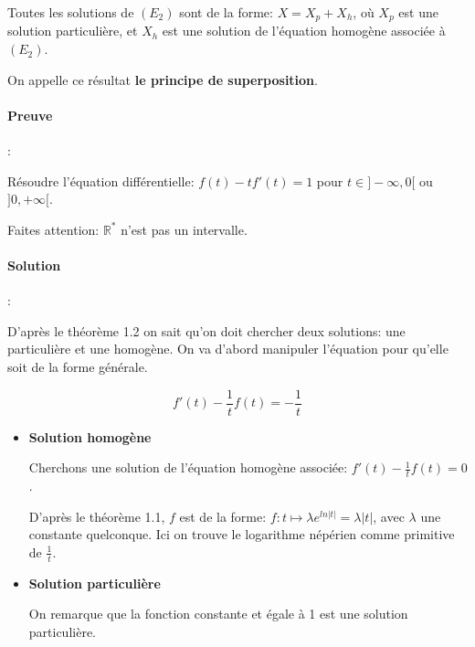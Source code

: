 \documentclass{article}
\begin{document}
\begin{tcolorbox}[colback=red!5!white,colframe=red!75!black,title=Théorème 1.2]

Toutes les solutions de $(E_{2})$ sont de la forme: $X = X_{p} + X_{h}$, où $X_{p}$ est une solution particulière, et $X_{h}$ est une solution de l'équation homogène associée à $(E_{2})$.

\tcblower

On appelle ce résultat \textbf{le principe de superposition}.

\end{tcolorbox}

\paragraph{Preuve}: \space





\begin{tcolorbox}[colback=cyan!5!white,colframe=cyan!75!black,title=Exemple 1.5]

Résoudre l'équation différentielle: $f(t) - tf'(t) = 1$ pour $t \in ]- \infty, 0[ $ ou $ ]0, +\infty[$.

\tcblower

Faites attention: $\mathbb{R}^{*} $ n'est pas un intervalle.

\end{tcolorbox}

\paragraph{Solution}: \space

D'après le théorème 1.2 on sait qu'on doit chercher deux solutions: une particulière et une homogène. On va d'abord manipuler l'équation pour qu'elle soit de la forme générale.

\[
f'(t) - \frac{1}{t} f(t) = - \frac{1}{t}
\]

\begin{itemize}
 \item \textbf{Solution homogène}
 
 Cherchons une solution de l'équation homogène associée: $f'(t) - \frac{1}{t} f(t) = 0$.
 
 D'après le théorème 1.1, $f$ est de la forme: $f : t \mapsto \lambda e^{ln|t|} = \lambda |t|$, avec $\lambda$ une constante quelconque. Ici on trouve le logarithme népérien comme primitive de $\frac{1}{t}$.
 

 \item \textbf{Solution particulière}
 
 On remarque que la fonction constante et égale à 1 est une solution particulière.

\end{itemize}
\end{document}
